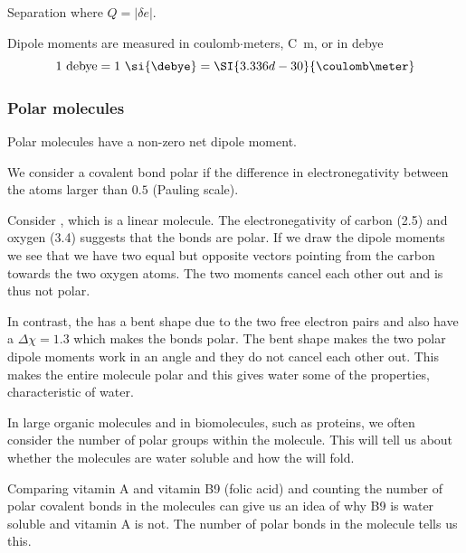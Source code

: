 \documentclass[../mit-general-chemistry.tex]{subfiles}
\begin{document}
Separation where $Q = |\delta e|$.

Dipole moments are measured in coulomb$\cdot$meters,
\si{\coulomb\meter}, or in debye
\begin{equation*}
  1~\text{debye} = 1~\si{\debye} = \SI{3.336d-30}{\coulomb\meter}
\end{equation*}


\subsubsection{Polar molecules}

Polar molecules have a non-zero net dipole moment.

We consider a covalent bond polar if the difference in
electronegativity between the atoms larger than $0.5$ (Pauling
scale).


Consider , which is a linear molecule. The electronegativity
of carbon (2.5) and oxygen (3.4) suggests that the  bonds
are polar. If we draw the dipole moments we see that we have two equal
but opposite vectors pointing from the carbon towards the two oxygen
atoms. The two moments cancel each other out and  is thus not
polar.

\begin{center}
\end{center}


In contrast, the  has a bent shape due to the two free
electron pairs and also have a $\Delta\chi = 1.3$ which makes the
 bonds polar. The bent shape makes the two polar dipole
moments work in an angle and they do not cancel each other out. This
makes the entire molecule polar and this gives water some of the
properties, characteristic of water.

\begin{center}
\end{center}



In large organic molecules and in biomolecules, such as proteins, we
often consider the number of polar groups within the molecule. This
will tell us about whether the molecules are water soluble and how the
will fold.


Comparing vitamin A and vitamin B9 (folic acid) and counting the number
of polar covalent bonds in the molecules can give us an idea of why B9
is water soluble and vitamin A is not. The number of polar bonds in
the molecule tells us this.






\end{document}
